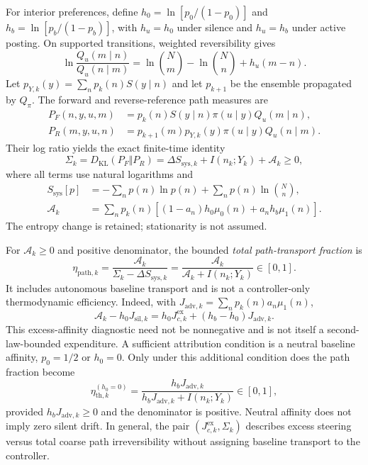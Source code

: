 For interior preferences, define $h_0=\ln[p_0/(1-p_0)]$ and
$h_b=\ln[p_b/(1-p_b)]$, with $h_u=h_0$ under silence and $h_u=h_b$
under active posting. On supported transitions, weighted reversibility gives
\begin{equation}
\ln\frac{Q_u(m\mid n)}{Q_u(n\mid m)}
=\ln\binom{N}{m}-\ln\binom{N}{n}+h_u(m-n).
\label{eq:blackboard_branch_ratio}
\end{equation}
Let $p_{Y,k}(y)=\sum_np_k(n)S(y\mid n)$ and let $p_{k+1}$ be the ensemble
propagated by $Q_\pi$. The forward and reverse-reference path measures are
\begin{align}
P_F(n,y,u,m)&=p_k(n)S(y\mid n)\pi(u\mid y)Q_u(m\mid n),\\
P_R(m,y,u,n)&=p_{k+1}(m)p_{Y,k}(y)\pi(u\mid y)Q_u(n\mid m).
\end{align}
Their log ratio yields the exact finite-time identity
\begin{equation}
\boxed{\Sigma_k=D_{\mathrm{KL}}(P_F\Vert P_R)
=\Delta S_{\mathrm{sys},k}+I(n_k;Y_k)+\mathcal{A}_k\ge0,}
\label{eq:finite_time_second_law}
\end{equation}
where all terms use natural logarithms and
\begin{align}
S_{\mathrm{sys}}[p]&=-\sum_n p(n)\ln p(n)
+\sum_n p(n)\ln\binom{N}{n},
\label{eq:system_entropy_functional}\\
\mathcal{A}_k&=\sum_n p_k(n)
\left[(1-a_n)h_0\mu_0(n)+a_n h_b\mu_1(n)\right].
\label{eq:blackboard_affinity_flow}
\end{align}
The entropy change is retained; stationarity is not assumed.

For $\mathcal{A}_k\ge0$ and positive denominator, the bounded
\emph{total path-transport fraction} is
\begin{equation}
\eta_{\mathrm{path},k}
=\frac{\mathcal{A}_k}{\Sigma_k-\Delta S_{\mathrm{sys},k}}
=\frac{\mathcal{A}_k}{\mathcal{A}_k+I(n_k;Y_k)}\in[0,1].
\label{eq:blackboard_eta_path}
\end{equation}
It includes autonomous baseline transport and is not a controller-only
thermodynamic efficiency. Indeed, with
$J_{\mathrm{adv},k}=\sum_np_k(n)a_n\mu_1(n)$,
\begin{equation}
\mathcal{A}_k-h_0J_{\mathrm{sil},k}
=h_0J_{c,k}^{\mathrm{ex}}+(h_b-h_0)J_{\mathrm{adv},k}.
\end{equation}
This excess-affinity diagnostic need not be nonnegative and is not itself a
second-law-bounded expenditure. A sufficient attribution condition is a
neutral baseline affinity, $p_0=1/2$ or $h_0=0$. Only under this additional
condition does the path fraction become
\begin{equation}
\eta_{\mathrm{th},k}^{(h_0=0)}
=\frac{h_bJ_{\mathrm{adv},k}}
{h_bJ_{\mathrm{adv},k}+I(n_k;Y_k)}\in[0,1],
\label{eq:eta_th}
\end{equation}
provided $h_bJ_{\mathrm{adv},k}\ge0$ and the denominator is positive.
Neutral affinity does not imply zero silent drift. In general, the pair
$(J_{c,k}^{\mathrm{ex}},\Sigma_k)$ describes excess steering versus total coarse
path irreversibility without assigning baseline transport to the controller.

